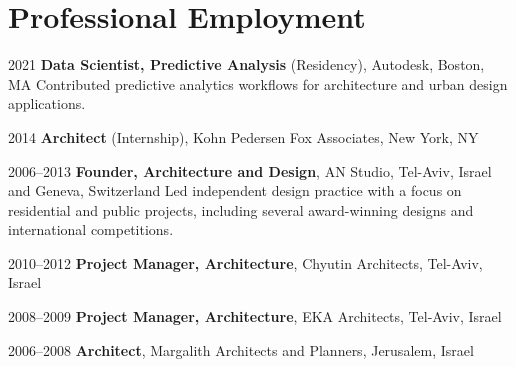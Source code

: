 \section*{Professional Employment}

\begin{tablist}

    \item[2021]\tab\textbf{Data Scientist, Predictive Analysis} (Residency),
    Autodesk, Boston, MA
    \newline Contributed predictive analytics workflows for architecture and urban design applications.

    \item[2014]\tab\textbf{Architect} (Internship),
    Kohn Pedersen Fox Associates, New York, NY

    \item[2006--2013]\tab\textbf{Founder, Architecture and Design},
    AN Studio, Tel-Aviv, Israel and Geneva, Switzerland
    \newline Led independent design practice with a focus on residential and public projects, including several award-winning designs and international competitions.

    \item[2010--2012]\tab\textbf{Project Manager, Architecture},
    Chyutin Architects, Tel-Aviv, Israel

    \item[2008--2009]\tab\textbf{Project Manager, Architecture},
    EKA Architects, Tel-Aviv, Israel

    \item[2006--2008]\tab\textbf{Architect},
    Margalith Architects and Planners, Jerusalem, Israel

\end{tablist}
